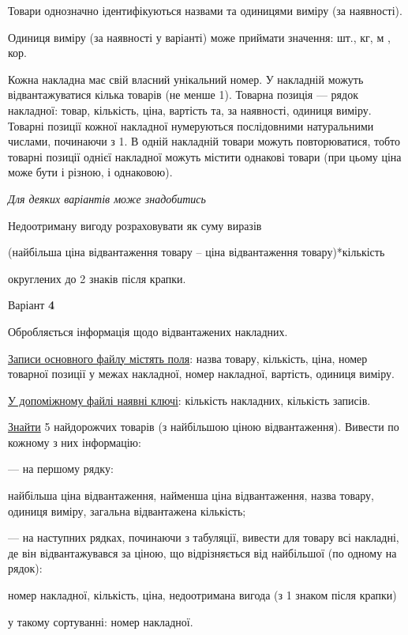 \documentclass[11pt, ukrainian]{article}
\begin{document}
Товари однозначно ідентифікуються назвами та одиницями виміру (за наявності).

Одиниця виміру (за наявності у варіанті) може приймати значення: шт., кг, м , кор.

Кожна накладна має свій власний унікальний номер.
У накладній можуть відвантажуватися кілька товарів (не менше 1).
Товарна позиція --- рядок накладної: товар, кількість, ціна, вартість та, за наявності, одиниця виміру.
Товарні позиції кожної накладної нумеруються послідовними натуральними числами, починаючи з 1.
В одній накладній товари можуть повторюватися, 
тобто товарні позиції однієї накладної можуть містити однакові товари 
(при цьому ціна може бути і різною, і однаковою).

\bigskip\textit{Для деяких варіантів може знадобитись}

Недоотриману вигоду розраховувати як суму виразів
{\center (найбільша ціна відвантаження товару – ціна відвантаження товару)*кількість\par}

\bigskip
{\noindent} округлених до 2 знаків після крапки.


\par
\newpage
{\center Варіант  \No \textbf { 4 }\par}
\bigskip
Обробляється інформація щодо відвантажених накладних.

\underline{Записи основного файлу містять поля}: назва товару, кількість, ціна, номер товарної позиції у межах накладної, номер накладної, вартість, одиниця виміру.

\underline{У допоміжному файлі наявні ключі}: кількість накладних, кількість записів.

\underline{Знайти} 5 найдорожчих товарів (з найбільшою ціною відвантаження). Вивести по кожному з них інформацію:\par
{\noindent}--- на першому рядку:\par
найбільша ціна відвантаження, найменша ціна відвантаження, назва товару, одиниця виміру, загальна відвантажена кількість;

{\noindent}--- на наступних рядках, починаючи з табуляції, вивести для товару всі накладні, де він відвантажувався за ціною, що відрізняється від найбільшої (по одному на рядок):\par
номер накладної, кількість, ціна, недоотримана вигода (з 1 знаком після крапки)

{\noindent}у такому сортуванні: номер накладної.
\end{document}
